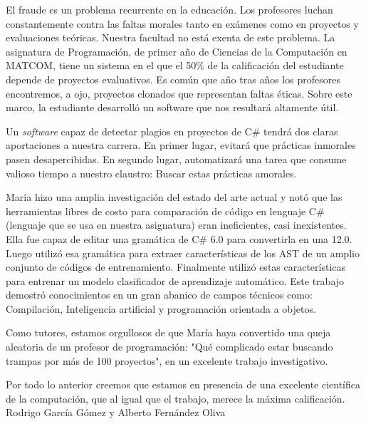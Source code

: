 \begin{opinion}
   
El fraude es un problema recurrente en la educación. Los profesores luchan constantemente contra las faltas morales tanto en exámenes como en proyectos y evaluaciones teóricas. Nuestra facultad no está exenta de este problema. La asignatura de Programación, de primer año de Ciencias de la Computación en MATCOM, tiene un sistema en el que el 50\% de la calificación del estudiante depende de proyectos evaluativos. Es común que año tras años los profesores encontremos, a ojo, proyectos clonados que representan faltas éticas. Sobre este marco, la estudiante desarrolló un software que nos resultará altamente útil.

Un \textit{software} capaz de detectar plagios en proyectos de C\# tendrá dos claras aportaciones a nuestra carrera. En primer lugar, evitará que prácticas inmorales pasen desapercibidas. En segundo lugar, automatizará una tarea que consume valioso tiempo a nuestro claustro: Buscar estas prácticas amorales.

María hizo una amplia investigación del estado del arte actual y notó que las herramientas libres de costo para comparación de código en lenguaje C\# (lenguaje que se usa en nuestra asignatura) eran ineficientes, casi inexistentes. Ella fue capaz de editar una gramática de C\# 6.0 para convertirla en una 12.0. Luego utilizó esa gramática para extraer características de los AST de un amplio conjunto de códigos de entrenamiento. Finalmente utilizó estas características para entrenar un modelo clasificador de aprendizaje automático. Este trabajo demostró conocimientos en un gran abanico de campos técnicos como: Compilación, Inteligencia artificial y programación orientada a objetos.

Como tutores, estamos orgullosos de que María haya convertido una queja aleatoria de un profesor de programación: "Qué complicado estar buscando trampas por más de 100 proyectos", en un excelente trabajo investigativo.

Por todo lo anterior creemos que estamos en presencia de una excelente científica de la computación, que al igual que el trabajo, merece la máxima calificación.\\
Rodrigo García Gómez y Alberto Fernández Oliva
   
\end{opinion}